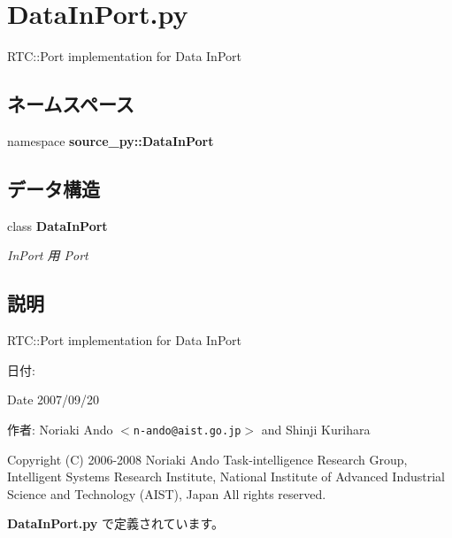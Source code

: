 \section{DataInPort.py}
\label{_data_in_port_8py}
RTC::Port implementation for Data InPort 

\subsection*{ネームスペース}
\begin{CompactItemize}
\item 
namespace \textbf{source\_\-py::DataInPort}
\end{CompactItemize}
\subsection*{データ構造}
\begin{CompactItemize}
\item 
class {\bf DataInPort}
\begin{CompactList}\small\item\em InPort 用 Port \item\end{CompactList}\end{CompactItemize}


\subsection{説明}
RTC::Port implementation for Data InPort 

\begin{Desc}
\item[日付:]\end{Desc}
\begin{Desc}
\item[Date]2007/09/20 \end{Desc}
\begin{Desc}
\item[作者:]Noriaki Ando $<${\tt n-ando@aist.go.jp}$>$ and Shinji Kurihara\end{Desc}
Copyright (C) 2006-2008 Noriaki Ando Task-intelligence Research Group, Intelligent Systems Research Institute, National Institute of Advanced Industrial Science and Technology (AIST), Japan All rights reserved. 

 {\bf DataInPort.py} で定義されています。